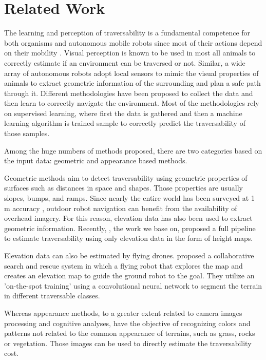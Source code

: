 \documentclass[../document.tex]{subfiles}
\begin{document}
\section{Related Work}
The learning and perception of traversability is
a fundamental competence for both organisms and autonomous mobile robots since most of their
actions depend on their mobility \cite{ugur2010traversability}. Visual perception is known to be used in most all animals to correctly estimate if an environment can be traversed or not.
Similar, a wide array of autonomous robots adopt local sensors to mimic the visual properties of animals to extract geometric information of the surrounding and plan a safe path through it. Different methodologies have been proposed to collect the data and then learn to correctly navigate the environment.
Most of the methodologies rely on supervised learning, where first the data is gathered and then a machine learning algorithm is trained sample to correctly predict the traversability of those samples.

Among the huge numbers of methods proposed, there are two categories based on the input data: geometric and appearance based methods. 

Geometric methods aim to detect traversability using geometric properties of surfaces such as distances in space and shapes. Those properties are usually slopes, bumps, and ramps. Since nearly the entire world has been surveyed at 1 m accuracy \cite{sofman2006improving}, 
outdoor robot navigation can benefit from the availability of overhead imagery. For this reason, elevation data has also been used to extract geometric information. Recently, \cite{1709.05368}, the work we base on, proposed a full pipeline to estimate traversability using only elevation data in the form of height maps. 

Elevation data can also be estimated by flying drones. \cite{delmerico2016active} proposed a collaborative search and rescue system in which a flying robot that explores the map and creates an elevation map to guide the ground robot to the goal. They utilize an 'on-the-spot training' using a convolutional neural network to segment the terrain in different traversable classes.  

Whereas appearance methods, to a greater extent related to camera images processing and cognitive analyses, have the objective of recognizing colors and patterns not related to the common appearance of terrains, such as grass, rocks or vegetation. Those images can be used to directly estimate the traversability cost. 
\end{document}
